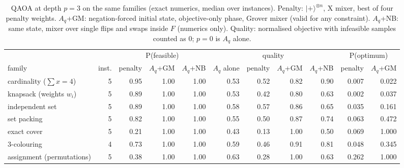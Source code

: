 \begin{table}[t]\centering\small\setlength{\tabcolsep}{3.5pt}
\caption{ QAOA at depth $p=3$ on the same families (exact numerics, median over instances). Penalty: $|+\rangle^{\otimes n}$, X mixer, best of four penalty weights. $A_q$+GM: negation-forced initial state, objective-only phase, Grover mixer (valid for any constraint). $A_q$+NB: same state, mixer over single flips and swaps inside $F$ (numerics only). Quality: normalised objective with infeasible samples counted as 0; $p{=}0$ is $A_q$ alone.}\label{tab:gen_qaoa}
\begin{tabular}{lrrrrrrrrrr}\toprule
& & \multicolumn{3}{c}{P(feasible)} & \multicolumn{4}{c}{quality} & \multicolumn{2}{c}{P(optimum)}\\\cmidrule(lr){3-5}\cmidrule(lr){6-9}\cmidrule(lr){10-11}
family & inst. & penalty & $A_q$+GM & $A_q$+NB & $A_q$ alone & penalty & $A_q$+GM & $A_q$+NB & penalty & $A_q$+GM\\\midrule
cardinality ($\sum x=4$) & 5 & 0.95 & 1.00 & 1.00 & 0.53 & 0.52 & 0.82 & 0.90 & 0.007 & 0.022\\
knapsack (weights $w_i$) & 5 & 0.89 & 1.00 & 1.00 & 0.53 & 0.42 & 0.80 & 0.63 & 0.002 & 0.037\\
independent set & 5 & 0.89 & 1.00 & 1.00 & 0.58 & 0.57 & 0.86 & 0.65 & 0.035 & 0.161\\
set packing & 5 & 0.82 & 1.00 & 1.00 & 0.55 & 0.50 & 0.87 & 0.74 & 0.063 & 0.472\\
exact cover & 5 & 0.21 & 1.00 & 1.00 & 0.43 & 0.13 & 1.00 & 0.50 & 0.069 & 1.000\\
3-colouring & 4 & 0.73 & 1.00 & 1.00 & 0.59 & 0.46 & 0.91 & 0.81 & 0.048 & 0.345\\
assignment (permutations) & 5 & 0.38 & 1.00 & 1.00 & 0.63 & 0.28 & 1.00 & 0.63 & 0.262 & 1.000\\
\bottomrule\end{tabular}\end{table}
